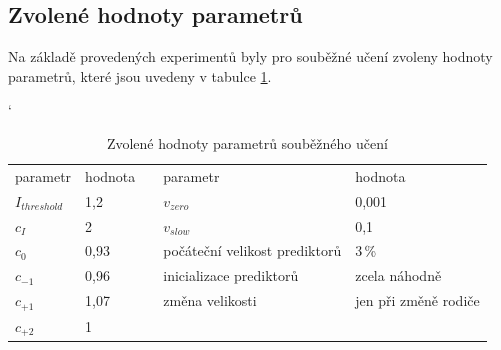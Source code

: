 \subsection{Zvolené hodnoty parametrů}

Na základě provedených experimentů byly pro souběžné učení zvoleny hodnoty parametrů, které jsou uvedeny v tabulce \ref{tabParams}.


\begin{table}[h]
    \renewcommand{\arraystretch}{1.2}
    \catcode`
    \centering
    \begin{tabular}{|l|l|c|l|l|}
        \cline{1-2}\cline{4-5}
        parametr & hodnota & & parametr & hodnota \\
        \cline{1-2}\cline{4-5}
        $I_\mathit{threshold}$ & 1,2   & & $v_\mathit{zero}$ & 0,001 \\
        $c_I$ & 2                      & & $v_\mathit{slow}$ & 0,1 \\
        $c_0$ & 0,93                   & & počáteční velikost prediktorů & 3\,\% \\
        $c_{-1}$ & 0,96                & & inicializace prediktorů & zcela náhodně \\
        $c_{+1}$ & 1,07                & & změna velikosti & jen při změně rodiče \\
        $c_{+2}$ & 1                   & & &\\
        \cline{1-2}\cline{4-5}
    \end{tabular}
    \caption{Zvolené hodnoty parametrů souběžného učení}
    \label{tabParams}
\end{table}



